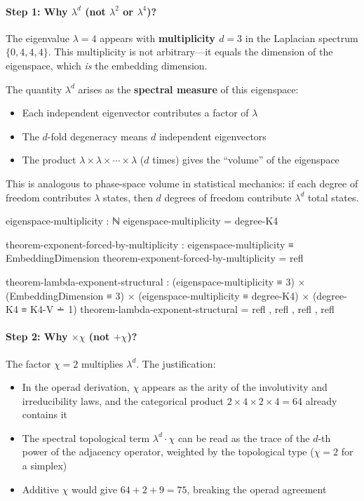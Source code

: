 \documentclass[11pt,a4paper]{book}
\begin{document}
\paragraph{Step 1: Why $\lambda^d$ (not $\lambda^2$ or $\lambda^4$)?}

The eigenvalue $\lambda = 4$ appears with \textbf{multiplicity $d = 3$} in the 
Laplacian spectrum $\{0, 4, 4, 4\}$. This multiplicity is not arbitrary---it 
equals the dimension of the eigenspace, which \emph{is} the embedding dimension.

The quantity $\lambda^d$ arises as the \textbf{spectral measure} of this eigenspace:
\begin{itemize}
\item Each independent eigenvector contributes a factor of $\lambda$
\item The $d$-fold degeneracy means $d$ independent eigenvectors
\item The product $\lambda \times \lambda \times \cdots \times \lambda$ ($d$ times) 
      gives the ``volume'' of the eigenspace
\end{itemize}

This is analogous to phase-space volume in statistical mechanics: if each degree 
of freedom contributes $\lambda$ states, then $d$ degrees of freedom contribute 
$\lambda^d$ total states.

\begin{code}
eigenspace-multiplicity : ℕ
eigenspace-multiplicity = degree-K4

theorem-exponent-forced-by-multiplicity : eigenspace-multiplicity ≡ EmbeddingDimension
theorem-exponent-forced-by-multiplicity = refl

theorem-lambda-exponent-structural : 
  (eigenspace-multiplicity ≡ 3) × (EmbeddingDimension ≡ 3) ×
  (eigenspace-multiplicity ≡ degree-K4) × (degree-K4 ≡ K4-V ∸ 1)
theorem-lambda-exponent-structural = refl , refl , refl , refl
\end{code}

\paragraph{Step 2: Why $\times \chi$ (not $+ \chi$)?}

The factor $\chi = 2$ multiplies $\lambda^d$. The justification:
\begin{itemize}
\item In the operad derivation, $\chi$ appears as the arity of the involutivity
  and irreducibility laws, and the categorical product $2 \times 4 \times 2 \times 4 = 64$
  already contains it
\item The spectral topological term $\lambda^d \cdot \chi$ can be read as the
  trace of the $d$-th power of the adjacency operator, weighted by the topological
  type ($\chi = 2$ for a simplex)
\item Additive $\chi$ would give $64 + 2 + 9 = 75$, breaking the operad agreement
\end{itemize}
\end{document}
